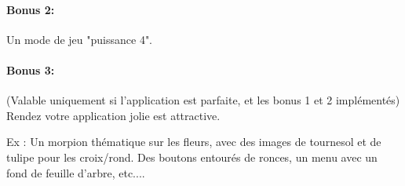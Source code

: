 \documentclass{article}
\begin{document}
\paragraph{Bonus 2:} Un mode de jeu "puissance 4".

\paragraph{Bonus 3:} (Valable uniquement si l'application est parfaite, et les bonus 1 et 2 implémentés) Rendez votre application jolie est attractive.

Ex : Un morpion thématique sur les fleurs, avec des images de tournesol et de tulipe pour les croix/rond. Des boutons entourés de ronces, un menu avec un fond de feuille d'arbre, etc....
\end{document}
